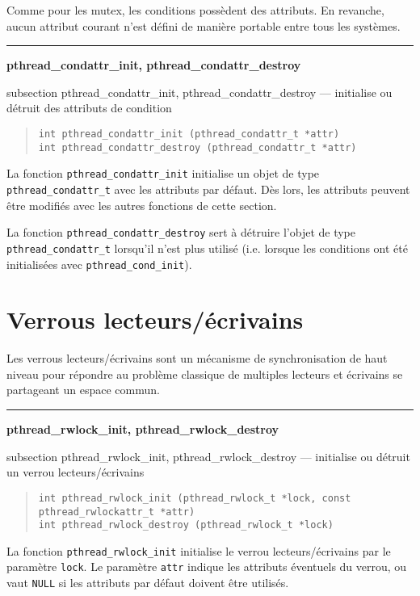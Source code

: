 \documentclass [twoside] {report}
\newcommand {\primitive} [1]
    {
	{\large \bf #1}
	\addcontentsline {toc} {subsection} {#1}
    }
\newcommand {\separation}
    {
	\vspace {7mm}
	\nopagebreak
	\hrule
    }
\begin{document}
Comme pour les mutex, les conditions possèdent des attributs. En
revanche, aucun attribut courant n'est défini de manière portable
entre tous les systèmes.


\separation
\primitive {pthread\_condattr\_init, pthread\_condattr\_destroy} --- initialise ou détruit des attributs de condition

\begin {quote}
\begin {verbatim}
int pthread_condattr_init (pthread_condattr_t *attr)
int pthread_condattr_destroy (pthread_condattr_t *attr)
\end{verbatim}
\end {quote}

La fonction \verb|pthread_condattr_init| initialise un objet de type
\verb|pthread_condattr_t| avec les attributs par défaut. Dès lors,
les attributs peuvent être modifiés avec les autres fonctions de
cette section.

La fonction \verb|pthread_condattr_destroy| sert à détruire
l'objet de type \verb|pthread_condattr_t| lorsqu'il n'est plus
utilisé (i.e.  lorsque les conditions ont été initialisées avec
\verb|pthread_cond_init|).


\section {Verrous lecteurs/écrivains}

Les verrous lecteurs/écrivains sont un mécanisme de synchronisation de
haut niveau pour répondre au problème classique de multiples lecteurs
et écrivains se partageant un espace commun.

\separation
\primitive {pthread\_rwlock\_init, pthread\_rwlock\_destroy} --- initialise ou détruit un verrou lecteurs/écrivains

\begin {quote}
\begin {verbatim}
int pthread_rwlock_init (pthread_rwlock_t *lock, const pthread_rwlockattr_t *attr)
int pthread_rwlock_destroy (pthread_rwlock_t *lock)
\end{verbatim}
\end {quote}

La fonction \verb|pthread_rwlock_init| initialise le verrou
lecteurs/écrivains par le paramètre \texttt {lock}.  Le paramètre
\texttt {attr} indique les attributs éventuels du verrou, ou vaut
\texttt {NULL} si les attributs par défaut doivent être utilisés.
\end{document}
